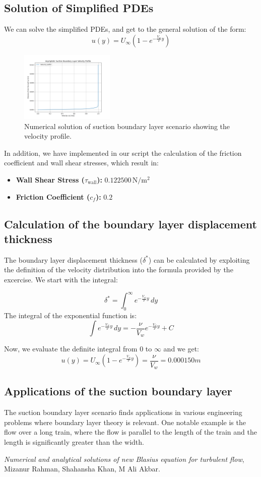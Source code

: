 \documentclass{article}
\begin{document}
\subsection{Solution of Simplified PDEs}
We can solve the simplified PDEs, and get to the general solution of the form:
\[
u(y) = U_\infty \left(1 - e^{-\frac{V_w}{\nu} y}\right)
\]
\begin{figure}[]
    \centering
    \includegraphics[width=0.4\textwidth]{output_plot.png}
    \caption{Numerical solution of suction boundary layer scenario showing the velocity profile.}
    \label{fig:suction boundary layer_solution}
\end{figure}

In addition, we have implemented in our script the calculation of the friction coefficient and wall shear stresses, which result in:
\begin{itemize}
    \item \textbf{Wall Shear Stress (\(\tau_{\text{wall}}\)):} \(0.122500 \, \mathrm{N/m^2}\)
    \item \textbf{Friction Coefficient (\(c_f\)):} \(0.2\)
\end{itemize}


\subsection{Calculation of the boundary layer displacement thickness}
The boundary layer displacement thickness (\(\delta^*\)) can be calculated by exploiting the definition of the velocity distribution into the formula provided by the excercise.
We start with the integral:

\[
\delta^* = \int_0^\infty e^{-\frac{V_w}{\nu} y} \, dy
\]
The integral of the exponential function is:
\[
\int e^{-\frac{V_w}{\nu} y} \, dy = -\frac{\nu}{V_w} e^{-\frac{V_w}{\nu} y} + C
\]

Now, we evaluate the definite integral from \(0\) to \(\infty\) and we get:
\[
u(y) = U_\infty \left(1 - e^{-\frac{V_w}{\nu} y}\right) = \frac{\nu}{V_w} = 0.000150 m
\]

\subsection{Applications of the suction boundary layer}
The suction boundary layer scenario finds applications in various engineering problems where boundary layer theory is relevant. One notable example is the flow over a long train, where the flow is parallel to the length of the train and the length is significantly greater than the width. 

\begin{thebibliography}{9}

  \textit{Numerical and analytical solutions of new Blasius equation for turbulent flow},
  Mizanur Rahman, Shahansha Khan, M Ali Akbar.
\end{thebibliography}
\end{document}
